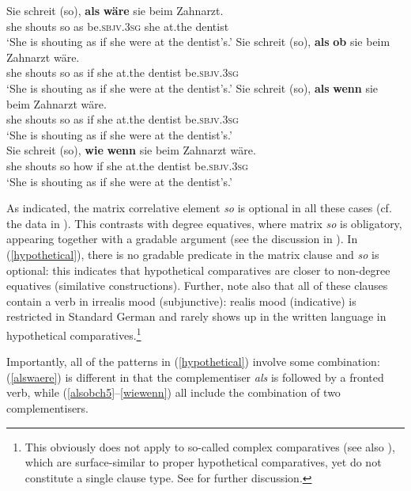 \ea \label{hypothetical}
\ea \gll	Sie	schreit	(so),	\textbf{als}	\textbf{wäre}	sie	beim	Zahnarzt. \label{alswaere}\\
she	shouts \phantom{(}so	as be.\textsc{sbjv.3sg}	she	at.the dentist\\
\glt `She is shouting as if she were at the dentist's.'
\ex \gll	Sie	schreit	(so),	\textbf{als}	\textbf{ob}	sie	beim	Zahnarzt	wäre. \label{alsobch5}\\
she	shouts \phantom{(}so	as if she	at.the dentist	be.\textsc{sbjv.3sg}\\
\glt `She is shouting as if she were at the dentist's.'
\ex \gll	Sie	schreit	(so),	\textbf{als}	\textbf{wenn}	sie	beim	Zahnarzt	wäre. \label{alswennch5}\\
she	shouts \phantom{(}so	as	if	she	at.the dentist	be.\textsc{sbjv.3sg}\\
\glt `She is shouting as if she were at the dentist's.'\\
\ex \gll	Sie	schreit	(so),	\textbf{wie}	\textbf{wenn}	sie	beim	Zahnarzt	wäre. \label{wiewenn}\\
she	shouts \phantom{(}so	how	if	she	at.the dentist	be.\textsc{sbjv.3sg}\\
\glt `She is shouting as if she were at the dentist's.'
\z
\z

As indicated, the matrix correlative element \textit{so} is optional in all these cases (cf. the data in \citealt[17]{jaeger2018}). This contrasts with degree equatives, where matrix \textit{so} is obligatory, appearing together with a gradable argument (see the discussion in ). In (\ref{hypothetical}), there is no gradable predicate in the matrix clause and \textit{so} is optional: this indicates that hypothetical comparatives are closer to non-degree equatives (similative constructions). Further, note also that all of these clauses contain a verb in irrealis mood (subjunctive): realis mood (indicative) is restricted in Standard German and rarely shows up in the written language in hypothetical comparatives.\footnote{This obviously does not apply to so-called complex comparatives (see also \citealt[167--168]{eggs2006}), which are surface-similar to proper hypothetical comparatives, yet do not constitute a single clause type. See \citet{bacskaiatkari2018jb} for further discussion.}

Importantly, all of the patterns in (\ref{hypothetical}) involve some combination: (\ref{alswaere}) is different in that the complementiser \textit{als} is followed by a fronted verb, while (\ref{alsobch5}--\ref{wiewenn}) all include the combination of two complementisers.

